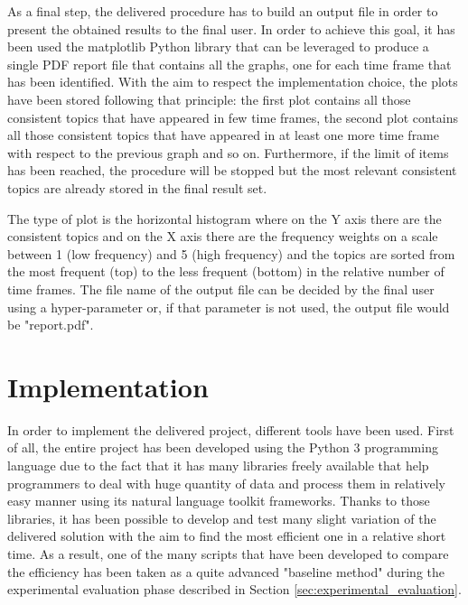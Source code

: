 As a final step, the delivered procedure has to build an output file in order to present the obtained results to the final user. In order to achieve this goal, it has been used the matplotlib Python library \cite{matplotlib-python} that can be leveraged to produce a single PDF report file that contains all the graphs, one for each time frame that has been identified. With the aim to respect the implementation choice, the plots have been stored following that principle: the first plot contains all those consistent topics that have appeared in few time frames, the second plot contains all those consistent topics that have appeared in at least one more time frame with respect to the previous graph and so on. Furthermore, if the limit of items has been reached, the procedure will be stopped but the most relevant consistent topics are already stored in the final result set.

\noindent The type of plot is the horizontal histogram where on the Y axis there are the consistent topics and on the X axis there are the frequency weights on a scale between 1 (low frequency) and 5 (high frequency) and the topics are sorted from the most frequent (top) to the less frequent (bottom) in the relative number of time frames. The file name of the output file can be decided by the final user using a hyper-parameter or, if that parameter is not used, the output file would be "report.pdf".

\section{Implementation}
\label{sec:implementation}
In order to implement the delivered project, different tools have been used. First of all, the entire project has been developed using the Python 3 programming language due to the fact that it has many libraries freely available that help programmers to deal with huge quantity of data and process them in relatively easy manner using its natural language toolkit frameworks. Thanks to those libraries, it has been possible to develop and test many slight variation of the delivered solution with the aim to find the most efficient one in a relative short time. As a result, one of the many scripts that have been developed to compare the efficiency has been taken as a quite advanced "baseline method" during the experimental evaluation phase described in Section \ref{sec:experimental_evaluation}. 

